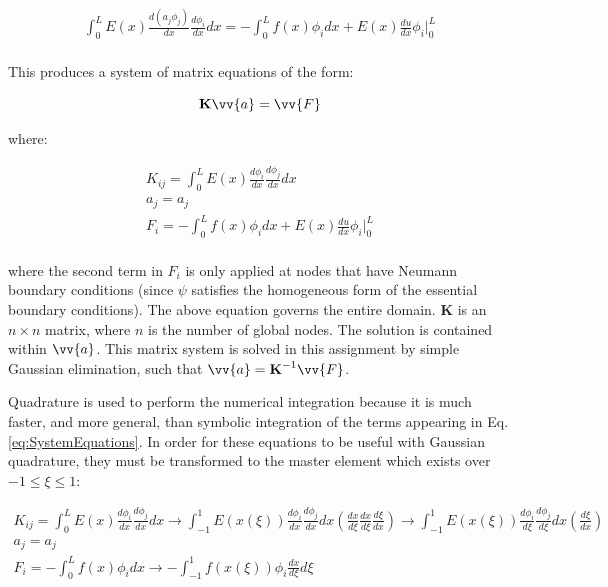 \documentclass[10pt]{article}
\begin{document}
\begin{equation}
\begin{aligned}
\int_{0}^{L}E(x)\frac{d\left(a_j\phi_j\right)}{dx}\frac{d\phi_i}{dx}dx=-\int_{0}^{L}f(x)\phi_idx+E(x)\frac{du}{dx}\phi_i\biggr\vert_{0}^{L}\\
\end{aligned}
\end{equation}

This produces a system of matrix equations of the form:

\begin{equation}
\label{eq:MatrixEqn}
\textbf{K}\vv{a}=\vv{F}
\end{equation}

where:

\begin{equation}
\begin{aligned}
\label{eq:SystemEquations}
K_{ij}=\int_{0}^{L}E(x)\frac{d\phi_i}{dx}\frac{d\phi_j}{dx}dx\\
a_j=a_j\\
F_i=-\int_{0}^{L}f(x)\phi_idx+E(x)\frac{du}{dx}\phi_i\biggr\vert_{0}^{L}\\
\end{aligned}
\end{equation}

where the second term in \(F_i\) is only applied at nodes that have Neumann boundary conditions (since \(\psi\) satisfies the homogeneous form of the essential boundary conditions). The above equation governs the entire domain. \(\textbf{K}\) is an \(n \times n\) matrix, where \(n\) is the number of global nodes. The solution is contained within \(\vv{a}\). This matrix system is solved in this assignment by simple Gaussian elimination, such that \(\vv{a}=\textbf{K}^{-1}\vv{F}\).

Quadrature is used to perform the numerical integration because it is much faster, and more general, than symbolic integration of the terms appearing in Eq. \eqref{eq:SystemEquations}. In order for these equations to be useful with Gaussian quadrature, they must be transformed to the master element which exists over \(-1\leq\xi\leq1\):

\begin{equation}
\label{eq:GoverningEqnsIsoparametric}
\begin{aligned}
K_{ij}=\int_{0}^{L}E(x)\frac{d\phi_i}{dx}\frac{d\phi_j}{dx}dx\rightarrow\int_{-1}^{1}E(x(\xi))\frac{d\phi_i}{dx}\frac{d\phi_j}{dx}dx\left(\frac{dx}{d\xi}\frac{dx}{d\xi}\frac{d\xi}{dx}\right)\rightarrow\int_{-1}^{1}E(x(\xi))\frac{d\phi_i}{d\xi}\frac{d\phi_j}{d\xi}dx\left(\frac{d\xi}{dx}\right)\\
a_j=a_j\\
F_i=-\int_{0}^{L}f(x)\phi_idx\rightarrow-\int_{-1}^{1}f(x(\xi))\phi_i\frac{dx}{d\xi}d\xi\\
\end{aligned}
\end{equation} 
\end{document}
